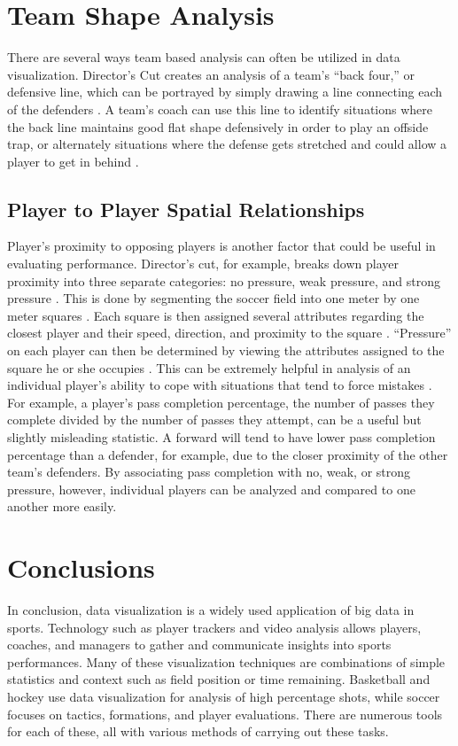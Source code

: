 \documentclass[sigconf]{acmart}
\begin{document}
\section{Team Shape Analysis}

There are several ways team based analysis can often be utilized in data visualization. Director’s Cut creates an analysis of a team’s “back four,” or defensive line, which can be portrayed by simply drawing a line connecting each of the defenders \cite{Director's Cut}. A team’s coach can use this line to identify situations where the back line maintains good flat shape defensively in order to play an offside trap, or alternately situations where the defense gets stretched and could allow a player to get in behind \cite{Director's Cut}.

\subsection{Player to Player Spatial Relationships}

Player’s proximity to opposing players is another factor that could be useful in evaluating performance. Director’s cut, for example, breaks down player proximity into three separate categories: no pressure, weak pressure, and strong pressure \cite{Director's Cut}. This is done by segmenting the soccer field into one meter by one meter squares \cite{Director's Cut}. Each square is then assigned several attributes regarding the closest player and their speed, direction, and proximity to the square \cite{Director's Cut}. “Pressure” on each player can then be determined by viewing the attributes assigned to the square he or she occupies \cite{Director's Cut}. This can be extremely helpful in analysis of an individual player’s ability to cope with situations that tend to force mistakes \cite{Director's Cut}. For example, a player’s pass completion percentage, the number of passes they complete divided by the number of passes they attempt, can be a useful but slightly misleading statistic. A forward will tend to have lower pass completion percentage than a defender, for example, due to the closer proximity of the other team’s defenders. By associating pass completion with no, weak, or strong pressure, however, individual players can be analyzed and compared to one another more easily.

\section{Conclusions}

In conclusion, data visualization is a widely used application of big data in sports. Technology such as player trackers and video analysis allows players, coaches, and managers to gather and communicate insights into sports performances. Many of these visualization techniques are combinations of simple statistics and context such as field position or time remaining. Basketball and hockey use data visualization for analysis of high percentage shots, while soccer focuses on tactics, formations, and player evaluations. There are numerous tools for each of these, all with various methods of carrying out these tasks.


 
\end{document}
